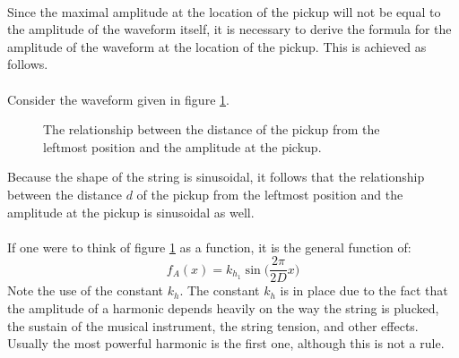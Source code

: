 \documentclass{article}
\begin{document}
\paragraph*{} 
Since the maximal amplitude at the location of the pickup will not be equal to 
the amplitude of the waveform itself, it is necessary to derive the formula 
for the amplitude of the waveform at the location of the pickup. This is 
achieved as follows.

\paragraph*{} 
Consider the waveform given in figure \ref{fig:harmonic-1-rel}.
\begin{figure}[ht]
	\centering
	\caption{The relationship between the distance of the pickup from the 
	leftmost position and the amplitude at the pickup.}
	\label{fig:harmonic-1-rel}
\end{figure}
Because the shape of the string is sinusoidal, it follows that the 
relationship between the distance $d$ of the pickup from the leftmost position 
and the amplitude at the pickup is sinusoidal as well. 

\paragraph*{}
If one were to think of figure \ref{fig:harmonic-1-rel} as a function, it is 
the general function of:
$$f_A(x) = k_{h_1} \sin\Big(\frac{2\pi}{2 D} x\Big)$$
Note the use of the constant $k_h$. The constant $k_h$ is in place due to the 
fact that the amplitude of a harmonic depends heavily on the way the string is 
plucked, the sustain of the musical instrument, the string tension, and other 
effects. Usually the most powerful harmonic is the first one, although this is 
not a rule.
\end{document}
